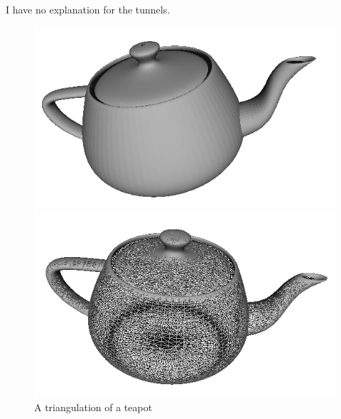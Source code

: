 \documentclass[11pt,a4paper,twoside]{report}
\begin{document}
I have no explanation for the tunnels.
\begin{figure}[H]
\begin{minipage}[b]{0.45\linewidth}
\center
\includegraphics[scale=0.5]{teapot00.png}
\end{minipage}
\hspace{0.5cm}
\begin{minipage}[b]{0.45\linewidth}
\center
\includegraphics[scale=0.5]{teapot01.png}
\end{minipage}
\caption{A triangulation of a teapot}
\label{fig:teapot}
\end{figure}
\end{document}
